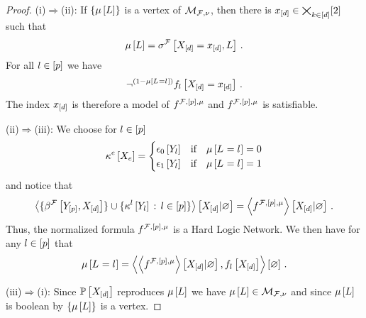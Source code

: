 \begin{proof}
    (i)$\Rightarrow$(ii):
    If $\{\mu\left[L\right]\}$ is a vertex of $\mathcal{M}_{\mathcal{F},\nu}$, then there is $x_{[d]}\in\bigtimes_{k\in[d]}[2]$ such that %
    \begin{align*}
        \mu\left[L\right] = \sigma^{\mathcal{F}}\left[X_{[d]}=x_{[d]},L\right] \, .
    \end{align*}
    For all $l\in[p]$ we have
    \begin{align*}
        \lnot^{(1-\mu\left[L_{}=l_{}\right])}f_{l}\left[X_{[d]}=x_{[d]}\right] \, .
    \end{align*}
    The index $x_{[d]}$ is therefore a model of $f^{\mathcal{F},[p],\mu}$ and $f^{\mathcal{F},[p],\mu}$ is satisfiable.

    (ii)$\Rightarrow$(iii):
    We choose for $l\in[p]$
    \begin{align*}
        \kappa^{e}\left[X_{e}\right] = \begin{cases}
                         \epsilon_0\left[Y_{l}\right] & \text{if} \quad \mu\left[L_{}=l_{}\right]=0 \\
                         \epsilon_1\left[Y_{l}\right] & \text{if} \quad \mu\left[L_{}=l_{}\right]=1 \\
        \end{cases}
    \end{align*}
    and notice that
    \begin{align*}
        \left\langle \{\beta^{\mathcal{F}}\left[Y_{[p]},X_{[d]}\right]\}
        \cup \{\kappa^{l}\left[Y_{l}\right] \,:\, l\in[p]\}
        \right\rangle \left[ X_{[d]} | \varnothing \right] = \left\langle f^{\mathcal{F},[p],\mu}\right\rangle \left[ X_{[d]} | \varnothing \right] \, .
    \end{align*}
    Thus, the normalized formula $f^{\mathcal{F},[p],\mu}$ is a Hard Logic Network.
    We then have for any $l\in[p]$ that
    \begin{align*}
        \mu\left[L_{}=l_{}\right] = \left\langle \left\langle f^{\mathcal{F},[p],\mu}\right\rangle \left[ X_{[d]} | \varnothing \right],f_{l}\left[X_{[d]}\right]\right\rangle \left[ \varnothing \right]\, .
    \end{align*}

    (iii)$\Rightarrow$(i):
    Since $\mathbb{P}\left[X_{[d]}\right]$ reproduces $\mu\left[L\right]$ we have $\mu\left[L\right]\in\mathcal{M}_{\mathcal{F},\nu}$ and since $\mu\left[L\right]$ is boolean by  $\{\mu\left[L\right]\}$ is a vertex.
\end{proof}

